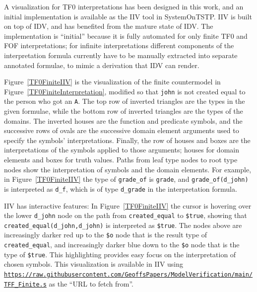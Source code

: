 \documentclass[letterpaper]{article}
\newcommand{\smalltt}[1]{\small \texttt{#1}}
\begin{document}
A visualization for TF0 interpretations has been designed in this work, and an initial
implementation is available as the IIV tool in SystemOnTSTP.
IIV is built on top of IDV, and has benefited from the mature state of IDV.
The implementation is ``initial'' because it is fully automated for only finite TF0 and FOF
interpretations; for infinite interpretations different components of the interpretation formula 
currently have to be manually extracted into separate annotated formulae, to mimic a derivation 
that IDV can render.

Figure~\ref{TF0FiniteIIV} is the visualization of the finite countermodel in 
Figure~\ref{TF0FiniteInterpretation}, modified so that {\smalltt{john}} is not created equal 
to the person who got an {\smalltt{A}}.
The top row of inverted triangles are the types in the given formulae,
while the bottom row of inverted triangles are the types of the domains.
The inverted houses are the function and predicate symbols, and the successive rows of ovals are 
the successive domain element arguments used to specify the symbols' interpretations.
Finally, the row of houses and boxes are the interpretations of the symbols applied to those
arguments; houses for domain elements and boxes for truth values.
Paths from leaf type nodes to root type nodes show the interpretation of symbols and the domain
elements.
For example, in Figure~\ref{TF0FiniteIIV} the type of {\smalltt{grade\_of}} is {\smalltt{grade}},
and {\smalltt{grade\_of(d\_john)}} is interpreted as {\smalltt{d\_f}}, which is of type
{\smalltt{d\_grade}} in the interpretation formula.

IIV has interactive features: In Figure~\ref{TF0FiniteIIV} the cursor is hovering over 
the lower {\smalltt{d\_john}} node on the path from {\smalltt{created\_equal}} to 
{\smalltt{\$true}}, showing that {\smalltt{created\_equal(d\_john,d\_john)}} is interpreted as 
{\smalltt{\$true}}.
The nodes above are increasingly darker red 
up to the {\smalltt{\$o}} node
that is the result type of {\smalltt{created\_equal}}, and increasingly darker blue down to 
the {\smalltt{\$o}} node that is the type of {\smalltt{\$true}}.
This highlighting provides easy focus on the interpretation of chosen symbols.
This visualization is available in IIV using 
{\smalltt{\url{https://raw.githubusercontent.com/GeoffsPapers/ModelVerification/main/TFF_Finite.s}}}
as the ``URL to fetch from''.
\end{document}
